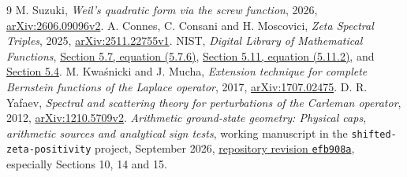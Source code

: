 \begin{thebibliography}{9}
 M. Suzuki, \emph{Weil's quadratic form via the screw function},
2026, \href{https://arxiv.org/abs/2606.09096v2}{arXiv:2606.09096v2}.
 A. Connes, C. Consani and H. Moscovici,
\emph{Zeta Spectral Triples}, 2025,
\href{https://arxiv.org/abs/2511.22755v1}{arXiv:2511.22755v1}.
 NIST, \emph{Digital Library of Mathematical Functions},
\href{https://dlmf.nist.gov/5.7.E6}{Section 5.7, equation (5.7.6)},
\href{https://dlmf.nist.gov/5.11.E2}{Section 5.11, equation (5.11.2)}, and
\href{https://dlmf.nist.gov/5.4}{Section 5.4}.
 M. Kwa\'snicki and J. Mucha, \emph{Extension technique for complete
Bernstein functions of the Laplace operator}, 2017,
\href{https://arxiv.org/abs/1707.02475}{arXiv:1707.02475}.
 D. R. Yafaev, \emph{Spectral and scattering theory for perturbations
of the Carleman operator}, 2012,
\href{https://arxiv.org/abs/1210.5709v2}{arXiv:1210.5709v2}.
 \emph{Arithmetic ground-state geometry: Physical caps,
arithmetic sources and analytical sign tests}, working manuscript in the
\texttt{shifted-zeta-positivity} project, September 2026,
\href{https://github.com/ebbaker/shifted-zeta-positivity/tree/efb908ab32245eba55c0c751f3b4a33b7306e6b7/papers/susy-positivity/investigations/arithmetic-ground-state-geometry}{repository revision \texttt{efb908a}}, especially Sections 10, 14 and 15.
\end{thebibliography}
